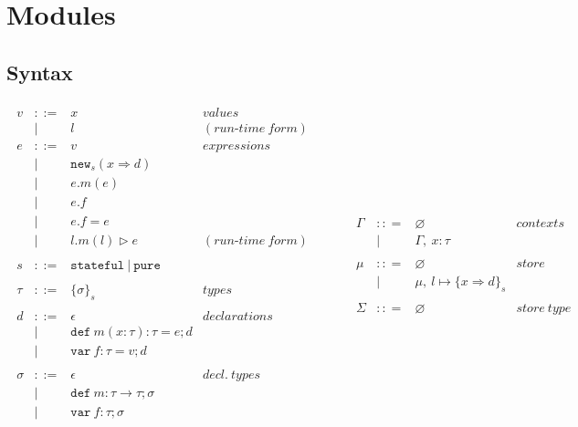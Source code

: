 \documentclass{llncs}
\newcommand{\keywadj}[1]{\mathtt{#1}}
\newcommand{\keyw}[1]{\keywadj{#1}~}
\begin{document}
\section{Modules}

\subsection{Syntax}

\[
\begin{array}{lll}
\begin{array}{lllr}
v & ::= & x & values \\
   & | & l & (run\mbox{-}time~form)\\
e & ::= & v & expressions \\
& | & \keywadj{new}_{s}(x \Rightarrow d) \\
& | & e.m(e)\\
& | & e.f \\
& | & e.f = e \\
& | & l.m(l) \rhd e & (run\mbox{-}time~form)\\
&&\\
s & ::= & \keyw{stateful} | ~\keyw{pure} \\
&&\\
\tau & ::= & \{ \sigma \}_{s} & types \\
&&\\
d & ::= & \epsilon & declarations \\
  & |   & \keyw{def} m(x:\tau):\tau = e; d \\
  & |   & \keyw{var} f:\tau = v; d \\
&&\\
\sigma & ::= & \epsilon & decl.~ types \\
       & |   & \keyw{def} m:\tau \rightarrow \tau; \sigma \\
       & |   & \keyw{var} f:\tau; \sigma \\
&&\\
\end{array}
& ~~~~~~
&
\begin{array}{lllr}
\Gamma & :: = & \varnothing & contexts\\
& | & \Gamma,~x : \tau\\
&&\\
\mu & :: = & \varnothing & store\\
& | & \mu,~l \mapsto \{ x \Rightarrow d \}_{s}\\
&&\\
\Sigma & :: = & \varnothing & store~type\\

\end{array}
\end{array}\]
\end{document}
